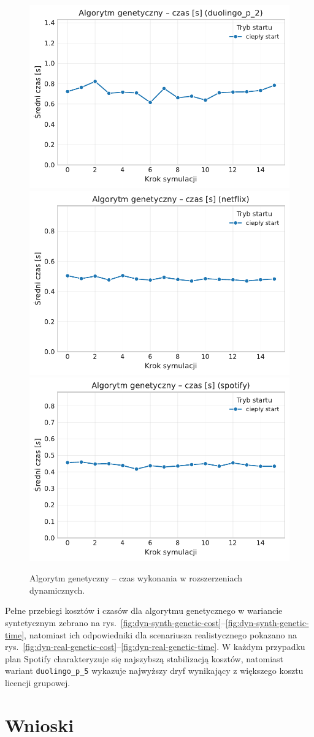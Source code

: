 \begin{figure}[H]
  \centering
  \includegraphics[width=0.32\linewidth]{assets/figures/extensions/dynamic/algorytm_genetyczny_time_steps_duolingo_p_2.pdf}
  \includegraphics[width=0.32\linewidth]{assets/figures/extensions/dynamic/algorytm_genetyczny_time_steps_netflix.pdf}
  \includegraphics[width=0.32\linewidth]{assets/figures/extensions/dynamic/algorytm_genetyczny_time_steps_spotify.pdf}
  \caption{Algorytm genetyczny -- czas wykonania w rozszerzeniach dynamicznych.}
  \label{fig:dyn-ext-genetic-time}
\end{figure}

Pełne przebiegi kosztów i czasów dla algorytmu genetycznego w wariancie syntetycznym zebrano na rys.~\ref{fig:dyn-synth-genetic-cost}--\ref{fig:dyn-synth-genetic-time}, natomiast ich odpowiedniki dla scenariusza realistycznego pokazano na rys.~\ref{fig:dyn-real-genetic-cost}--\ref{fig:dyn-real-genetic-time}. W każdym przypadku plan Spotify charakteryzuje się najszybszą stabilizacją kosztów, natomiast wariant \texttt{duolingo\_p\_5} wykazuje najwyższy dryf wynikający z większego kosztu licencji grupowej.

\section{Wnioski}

